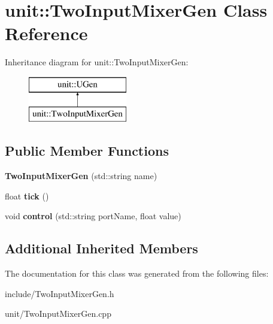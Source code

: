 \hypertarget{classunit_1_1TwoInputMixerGen}{}\section{unit\+:\+:Two\+Input\+Mixer\+Gen Class Reference}
\label{classunit_1_1TwoInputMixerGen}
Inheritance diagram for unit\+:\+:Two\+Input\+Mixer\+Gen\+:\begin{figure}[H]
\begin{center}
\leavevmode
\includegraphics[height=2.000000cm]{classunit_1_1TwoInputMixerGen}
\end{center}
\end{figure}
\subsection*{Public Member Functions}
\begin{DoxyCompactItemize}
\item 
{\bfseries Two\+Input\+Mixer\+Gen} (std\+::string name)\hypertarget{classunit_1_1TwoInputMixerGen_ae150f51a934ffb7330f8a2852b094539}{}\label{classunit_1_1TwoInputMixerGen_ae150f51a934ffb7330f8a2852b094539}

\item 
float {\bfseries tick} ()\hypertarget{classunit_1_1TwoInputMixerGen_aef96ef6828e767384a8881d108c0d52b}{}\label{classunit_1_1TwoInputMixerGen_aef96ef6828e767384a8881d108c0d52b}

\item 
void {\bfseries control} (std\+::string port\+Name, float value)\hypertarget{classunit_1_1TwoInputMixerGen_ab8d7d00eb0c692a8c2de706f58673d3d}{}\label{classunit_1_1TwoInputMixerGen_ab8d7d00eb0c692a8c2de706f58673d3d}

\end{DoxyCompactItemize}
\subsection*{Additional Inherited Members}


The documentation for this class was generated from the following files\+:\begin{DoxyCompactItemize}
\item 
include/Two\+Input\+Mixer\+Gen.\+h\item 
unit/Two\+Input\+Mixer\+Gen.\+cpp\end{DoxyCompactItemize}
